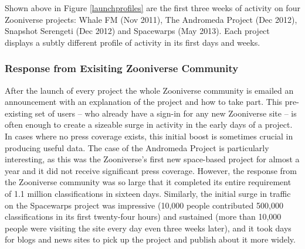 \documentclass{sigchi}
\begin{document}
Shown above in Figure \ref{launchprofiles} are the first three weeks of activity on four Zooniverse projects: Whale FM (Nov 2011), The Andromeda Project (Dec 2012), Snapshot Serengeti (Dec 2012) and Spacewarps (May 2013). Each project displays a subtly different profile of activity in its first days and weeks. %


\subsubsection{Response from Exisiting Zooniverse Community}

After the launch of every project the whole Zooniverse community is emailed an announcement with an explanation of the project and how to take part. This pre-existing set of users -- who already have a sign-in for any new Zooniverse site -- is often enough to create a sizeable surge in activity in the early days of a project. In cases where no press coverage exists, this initial boost is sometimes crucial in producing useful data. The case of the Andromeda Project is particularly interesting, as this was the Zooniverse's first new space-based project for almost a year and it did not receive significant press coverage. However, the response from the Zooniverse community was so large that it completed its entire requirement of 1.1 million classifications in sixteen days. Similarly, the initial surge in traffic on the Spacewarps project was impressive (10,000 people contributed 500,000 classifications in its first twenty-four hours) and sustained (more than 10,000 people were visiting the site every day even three weeks later), and it took days for blogs and news sites to pick up the project and publish about it more widely.


\end{document}
